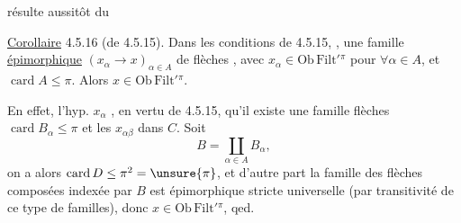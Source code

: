 résulte aussitôt du

\uline{Corollaire} 4.5.16 (de 4.5.15). Dans les conditions de 4.5.15,  ,
 une famille \uline{épimorphique}  $(x_\alpha\longrightarrow x)_{\alpha\in A}$ de flèches , avec $x_\alpha\in\mathrm{Ob}\,\mathrm{Filt}'{}^\pi$ pour $\forall\alpha\in A$, et $\operatorname{card}A\leq\pi$. Alors $x\in\mathrm{Ob}\,\mathrm{Filt}'{}^\pi$.

En effet, l'hyp.  $x_\alpha$  , en vertu de 4.5.15, qu'il existe une famille   flèches
   $\operatorname{card}B_\alpha\leq\pi$ et les $x_{\alpha\beta}$ dans $C$. Soit
\[
B=\coprod_{\alpha\in A}B_\alpha,
\]
on a alors $\operatorname{card}D\leq\pi^2=\unsure{\pi}$, et d'autre part la famille des flèches composées
indexée par $B$ est épimorphique stricte universelle (par transitivité de ce type de familles), donc $x\in\mathrm{Ob}\,\mathrm{Filt}'{}^\pi$, qed.

